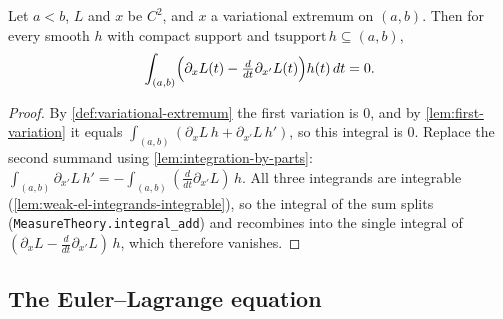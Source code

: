 \begin{lemma}
    \label{lem:weak-euler-lagrange}
    \leanok
    Let $a < b$, $L$ and $x$ be $C^2$, and $x$ a variational extremum on
    $(a,b)$. Then for every smooth $h$ with compact support and
    $\mathrm{tsupport}\, h \subseteq (a,b)$,
    \[
      \int_{(a,b)} \Bigl(\partial_x L(t) - \tfrac{d}{dt}\partial_{x'} L(t)\Bigr)
        h(t)\, dt = 0 .
    \]
\end{lemma}
\begin{proof}
    By \cref{def:variational-extremum} the first variation is $0$, and by
    \cref{lem:first-variation} it equals
    $\int_{(a,b)} (\partial_x L\, h + \partial_{x'} L\, h')$, so this integral is
    $0$. Replace the second summand using \cref{lem:integration-by-parts}:
    $\int_{(a,b)} \partial_{x'} L\, h' = - \int_{(a,b)} (\tfrac{d}{dt}\partial_{x'}
    L)\, h$. All three integrands are integrable
    (\cref{lem:weak-el-integrands-integrable}), so the integral of the sum splits
    (\texttt{MeasureTheory.integral\_add}) and recombines into the single integral
    of $(\partial_x L - \tfrac{d}{dt}\partial_{x'} L)\, h$, which therefore
    vanishes.
\end{proof}

\subsection{The Euler--Lagrange equation}

